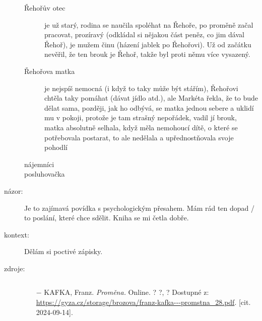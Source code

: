 \documentclass{article}
\begin{document}
\begin{description}
\begin{description}
            \item[Řehořův otec] je už starý, rodina se naučila spoléhat na Řehoře, po proměně začal pracovat, prozíravý (odkládal si nějakou část peněz, co jim dával Řehoř), je mužem činu (házení jablek po Řehořovi). Už od začátku nevěřil, že ten brouk je Řehoř, takže byl proti němu více vysazený.
            \item[Řehořova matka] je nejspíš nemocná (i když to taky může být stářím), Řehořovi chtěla taky pomáhat (dávat jídlo atd.), ale Markéta řekla, že to bude dělat sama, později, jak ho odbývá, se matka jednou sebere a uklidí mu v pokoji, protože je tam strašný nepořádek, vadil jí brouk, matka absolutně selhala, když měla nemohoucí dítě, o které se potřebovala postarat, to ale nedělala a upřednostňovala svoje pohodlí
            \item[nájemníci]
            \item[posluhovačka]
        \end{description}
    \item[názor:] Je to zajímavá povídka s psychologickým přesahem. Mám rád ten dopad / to poslání, které chce sdělit. Kniha se mi četla dobře.
    \item[kontext:]  Dělám si poctivé zápisky.
    \item[zdroje:] $ $
    \begin{itemize}
        \setlength\itemsep{0em}
        \item[$-$] KAFKA, Franz. \textit{Proměna.} Online. ? ?, ? Dostupné z: \url{https://gyza.cz/storage/brozova/franz-kafka---promstna_28.pdf}. [cit. 2024-09-14].
    \end{itemize}
\end{description}
\end{document}
